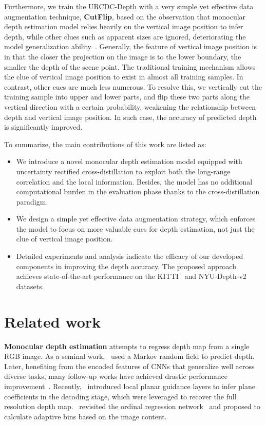 \documentclass[letterpaper]{article} \usepackage{aaai23}  \usepackage{times}  \usepackage{helvet}  \usepackage{courier}  \usepackage[hyphens]{url}  \usepackage{graphicx} \urlstyle{rm} \def\UrlFont{\rm}  \usepackage{natbib}  \usepackage{caption} \frenchspacing  \setlength{\pdfpagewidth}{8.5in} \setlength{\pdfpageheight}{11in} \usepackage{algorithm}
\begin{document}
Furthermore, we train the URCDC-Depth with a very simple yet effective data augmentation technique, \textbf{CutFlip}, based on the observation that monocular depth estimation model relies heavily on the vertical image position to infer depth, while other clues such as apparent sizes are ignored, deteriorating the model generalization ability~\cite{dijk2019neural}. Generally, the feature of vertical image position is in that the closer the projection on the image is to the lower boundary, the smaller the depth of the scene point. The traditional training mechanism allows the clue of vertical image position to exist in almost all training samples. In contrast, other cues are much less numerous. To resolve this, we vertically cut the training sample into upper and lower parts, and flip these two parts along the vertical direction with a certain probability, weakening the relationship between depth and vertical image position. In such case, the accuracy of predicted depth is significantly improved.

To summarize, the main contributions of this work are listed as:

\begin{itemize}
	\item We introduce a novel monocular depth estimation model equipped with  uncertainty rectified cross-distillation to exploit both the long-range correlation and the local information. Besides, the model has no additional computational burden in the evaluation phase thanks to the cross-distillation paradigm.
	\item We design a simple yet effective data augmentation strategy, which enforces the model to focus on more valuable cues for depth estimation, not just the clue of vertical image position.
	\item Detailed experiments and analysis indicate the efficacy of our developed components in improving the depth accuracy. The proposed approach achieves state-of-the-art performance on the KITTI~\cite{geiger2013vision} and NYU-Depth-v2~\cite{silberman2012indoor} datasets.
\end{itemize}



\section{Related work}
\textbf{Monocular depth estimation} attempts to regress depth map from a single RGB image. As a seminal work,~\citet{saxena2005learning} used a Markov random field to predict depth. Later, benefiting from the encoded features of CNNs that generalize well across diverse tasks, many follow-up works have achieved drastic performance improvement~\cite{eigen2014depth,qi2018geonet,fu2018deep}. Recently,~\citet{lee2019big} introduced local planar guidance layers to infer plane coefficients in the decoding stage, which were leveraged to recover the full resolution depth map.~\citet{bhat2021adabins} revisited the ordinal regression network~\cite{fu2018deep} and proposed to calculate adaptive bins based on the image content.
\end{document}
